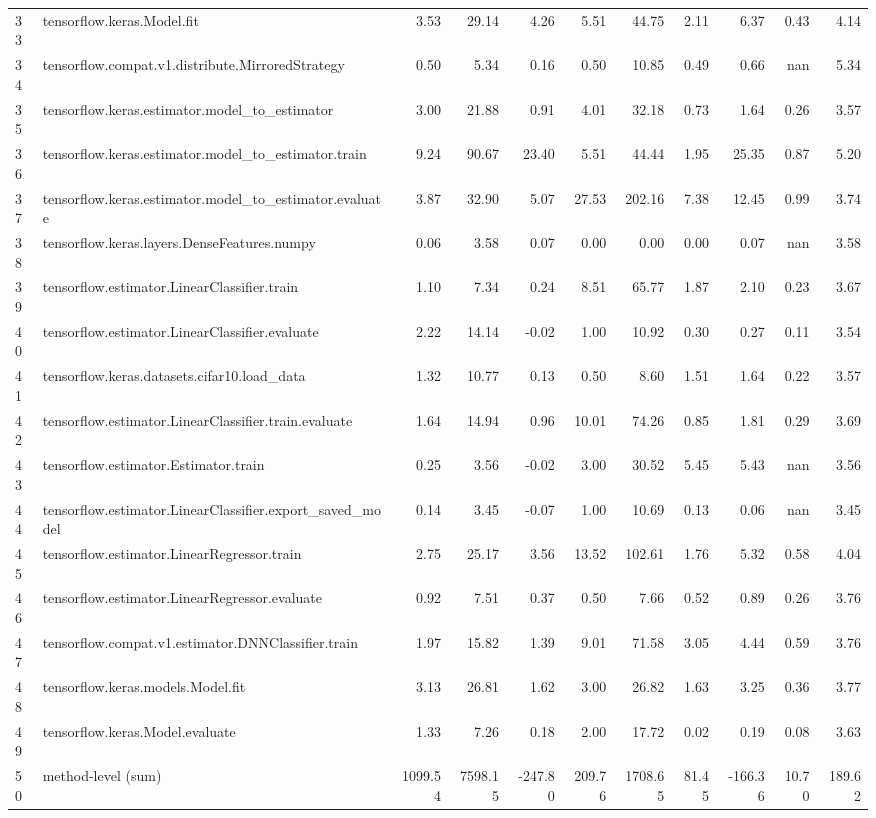 \begin{tabular}{llrrrrrrrrr}
33 & tensorflow.keras.Model.fit & 3.53 & 29.14 & 4.26 & 5.51 & 44.75 & 2.11 & 6.37 & 0.43 & 4.14 \\
34 & tensorflow.compat.v1.distribute.MirroredStrategy & 0.50 & 5.34 & 0.16 & 0.50 & 10.85 & 0.49 & 0.66 & nan & 5.34 \\
35 & tensorflow.keras.estimator.model_to_estimator & 3.00 & 21.88 & 0.91 & 4.01 & 32.18 & 0.73 & 1.64 & 0.26 & 3.57 \\
36 & tensorflow.keras.estimator.model_to_estimator.train & 9.24 & 90.67 & 23.40 & 5.51 & 44.44 & 1.95 & 25.35 & 0.87 & 5.20 \\
37 & tensorflow.keras.estimator.model_to_estimator.evaluate & 3.87 & 32.90 & 5.07 & 27.53 & 202.16 & 7.38 & 12.45 & 0.99 & 3.74 \\
38 & tensorflow.keras.layers.DenseFeatures.numpy & 0.06 & 3.58 & 0.07 & 0.00 & 0.00 & 0.00 & 0.07 & nan & 3.58 \\
39 & tensorflow.estimator.LinearClassifier.train & 1.10 & 7.34 & 0.24 & 8.51 & 65.77 & 1.87 & 2.10 & 0.23 & 3.67 \\
40 & tensorflow.estimator.LinearClassifier.evaluate & 2.22 & 14.14 & -0.02 & 1.00 & 10.92 & 0.30 & 0.27 & 0.11 & 3.54 \\
41 & tensorflow.keras.datasets.cifar10.load_data & 1.32 & 10.77 & 0.13 & 0.50 & 8.60 & 1.51 & 1.64 & 0.22 & 3.57 \\
42 & tensorflow.estimator.LinearClassifier.train.evaluate & 1.64 & 14.94 & 0.96 & 10.01 & 74.26 & 0.85 & 1.81 & 0.29 & 3.69 \\
43 & tensorflow.estimator.Estimator.train & 0.25 & 3.56 & -0.02 & 3.00 & 30.52 & 5.45 & 5.43 & nan & 3.56 \\
44 & tensorflow.estimator.LinearClassifier.export_saved_model & 0.14 & 3.45 & -0.07 & 1.00 & 10.69 & 0.13 & 0.06 & nan & 3.45 \\
45 & tensorflow.estimator.LinearRegressor.train & 2.75 & 25.17 & 3.56 & 13.52 & 102.61 & 1.76 & 5.32 & 0.58 & 4.04 \\
46 & tensorflow.estimator.LinearRegressor.evaluate & 0.92 & 7.51 & 0.37 & 0.50 & 7.66 & 0.52 & 0.89 & 0.26 & 3.76 \\
47 & tensorflow.compat.v1.estimator.DNNClassifier.train & 1.97 & 15.82 & 1.39 & 9.01 & 71.58 & 3.05 & 4.44 & 0.59 & 3.76 \\
48 & tensorflow.keras.models.Model.fit & 3.13 & 26.81 & 1.62 & 3.00 & 26.82 & 1.63 & 3.25 & 0.36 & 3.77 \\
49 & tensorflow.keras.Model.evaluate & 1.33 & 7.26 & 0.18 & 2.00 & 17.72 & 0.02 & 0.19 & 0.08 & 3.63 \\
50 & method-level (sum) & 1099.54 & 7598.15 & -247.80 & 209.76 & 1708.65 & 81.45 & -166.36 & 10.70 & 189.62 \\
\end{tabular}
